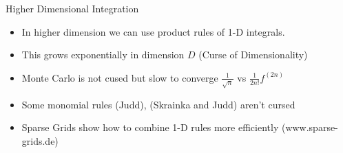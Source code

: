 \documentclass[aspectratio=169,11pt]{beamer}
\begin{document}
\begin{frame}{Higher Dimensional Integration}
\begin{itemize}
\item In higher dimension we can use product rules of 1-D integrals.
\item This grows exponentially in dimension $D$ (Curse of Dimensionality)
\item Monte Carlo is not cused but slow to converge $\frac{1}{\sqrt{n}}$ vs $\frac{1}{2n!} f^{(2n)}$
\item Some monomial rules (Judd), (Skrainka and Judd) aren't cursed
\item Sparse Grids show how to combine 1-D rules more efficiently (www.sparse-grids.de)
\end{itemize}
\end{frame}
\end{document}
